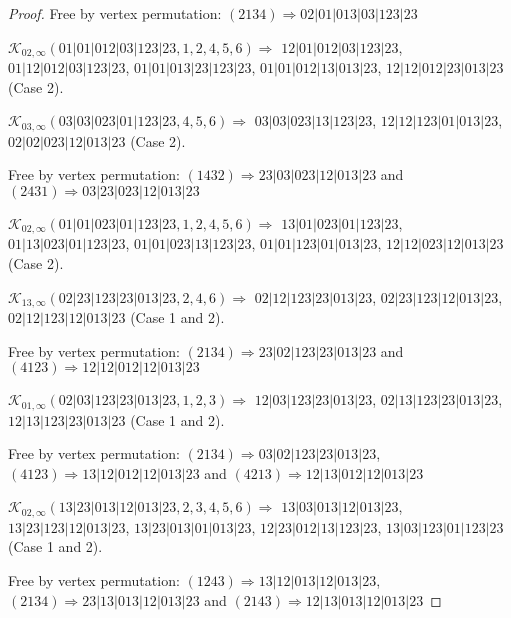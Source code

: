 \documentclass[12pt]{article}
\theoremstyle{plain}
\theoremstyle{definition}
\theoremstyle{remark}
\newcommand{\fancy}[1]{\mathcal{#1}}
\def\K{\fancy{K}}
\begin{document}
\begin{proof}
	
	
	Free by vertex permutation: $(2 1 3 4)\Rightarrow 02|01|013|03|123|23$
	
	
	\bigskip
	
	$\K_{02,\infty}(01|01|012|03|123|23,1, 2, 4, 5, 6)\Rightarrow $ $12|01|012|03|123|23$, $01|12|012|03|123|23$, $01|01|013|23|123|23$, $01|01|012|13|013|23$, $12|12|012|23|013|23$ (Case 2).
	
	\bigskip
	
	$\K_{03,\infty}(03|03|023|01|123|23,4, 5, 6)\Rightarrow $ $03|03|023|13|123|23$, $12|12|123|01|013|23$, $02|02|023|12|013|23$ (Case 2).
	
	
	
	Free by vertex permutation: $(1 4 3 2)\Rightarrow 23|03|023|12|013|23$ and $(2 4 3 1)\Rightarrow 03|23|023|12|013|23$
	
	
	\bigskip
	
	$\K_{02,\infty}(01|01|023|01|123|23,1, 2, 4, 5, 6)\Rightarrow $ $13|01|023|01|123|23$, $01|13|023|01|123|23$, $01|01|023|13|123|23$, $01|01|123|01|013|23$, $12|12|023|12|013|23$ (Case 2).
	
	\bigskip
	
	$\K_{13,\infty}(02|23|123|23|013|23,2, 4, 6)\Rightarrow $ $02|12|123|23|013|23$, $02|23|123|12|013|23$, $02|12|123|12|013|23$ (Case 1 and 2).
	
	
	
	Free by vertex permutation: $(2 1 3 4)\Rightarrow 23|02|123|23|013|23$ and $(4 1 2 3)\Rightarrow 12|12|012|12|013|23$
	
	
	\bigskip
	
	$\K_{01,\infty}(02|03|123|23|013|23,1, 2, 3)\Rightarrow $ $12|03|123|23|013|23$, $02|13|123|23|013|23$, $12|13|123|23|013|23$ (Case 1 and 2).
	
	
	
	Free by vertex permutation: $(2 1 3 4)\Rightarrow 03|02|123|23|013|23$, $(4 1 2 3)\Rightarrow 13|12|012|12|013|23$ and $(4 2 1 3)\Rightarrow 12|13|012|12|013|23$
	
	
	\bigskip
	
	$\K_{02,\infty}(13|23|013|12|013|23,2, 3, 4, 5, 6)\Rightarrow $ $13|03|013|12|013|23$, $13|23|123|12|013|23$, $13|23|013|01|013|23$, $12|23|012|13|123|23$, $13|03|123|01|123|23$ (Case 1 and 2).
	
	
	
	Free by vertex permutation: $(1 2 4 3)\Rightarrow 13|12|013|12|013|23$, $(2 1 3 4)\Rightarrow 23|13|013|12|013|23$ and $(2 1 4 3)\Rightarrow 12|13|013|12|013|23$
	

\end{proof}
\end{document}
